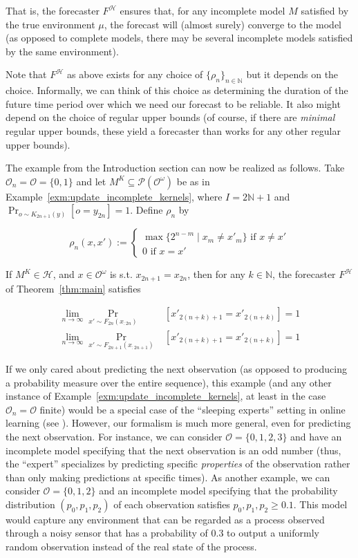 \documentclass[11pt]{article}
\theoremstyle{definition}
\theoremstyle{plain}
\newcommand{\Nats}{\mathbb{N}}
\newcommand{\Sq}[2]{\{#1\}_{#2 \in \Nats}}
\newcommand{\Sqn}[1]{\Sq{#1}{n}}
\newcommand{\PM}{\mathcal{P}}
\newcommand{\Ob}{\mathcal{O}}
\newcommand{\OO}{\Ob^\omega}
\newcommand{\PMO}{\PM(\OO)}
\newcommand{\MC}{\mathcal{H}}
\begin{document}
That is, the forecaster $F^\MC$ ensures that, for any incomplete model $M$ satisfied by the true environment $\mu$, the forecast will (almost surely) converge to the model (as opposed to complete models, there may be several incomplete models satisfied by the same environment).

Note that $F^\MC$ as above exists for any choice of $\Sqn{\rho_n}$ but it depends on the choice. Informally, we can think of this choice as determining the duration of the future time period over which we need our forecast to be reliable. It also might depend on the choice of regular upper bounds (of course, if there are \emph{minimal} regular upper bounds, these yield a forecaster than works for any other regular upper bounds).

The example from the Introduction section can now be realized as follows. Take $\Ob_n=\Ob=\{0,1\}$ and let $M^K \subseteq \PMO$ be as in Example~\ref{exm:update_incomplete_kernels}, where $I = 2\Nats+1$ and $\Pr_{o\sim K_{2n+1}(y)}\left[o=y_{2n}\right]=1$. Define $\rho_n$  by

\begin{equation}
\rho_n(x,x'):=\begin{cases} \max\{2^{n-m} \mid x_{m} \ne x'_{m}\} \text{ if } x \ne x' \\ 0 \text{ if } x=x'\end{cases}
\end{equation}

If $M^K \in \MC$, and $x\in\OO$ is s.t. $x_{2n+1}=x_{2n}$, then for any $k \in \Nats$, the forecaster $F^\MC$ of Theorem~\ref{thm:main} satisfies

\begin{align}
\lim_{n\rightarrow\infty} \Pr_{x' \sim F_{2n}\left(x_{:2n}\right)}&\left[x'_{2(n+k)+1}=x'_{2(n+k)}\right] = 1\\
\lim_{n\rightarrow\infty} \Pr_{x' \sim F_{2n+1}\left(x_{:2n+1}\right)}&\left[x'_{2(n+k)+1}=x'_{2(n+k)}\right] = 1
\end{align}

If we only cared about predicting the next observation (as opposed to producing a probability measure over the entire sequence), this example (and any other instance of Example~\ref{exm:update_incomplete_kernels}, at least in the case $\Ob_n=\Ob$ finite) would be a special case of the \enquote{sleeping experts} setting in online learning (see \cite{Freund_1997}). However, our formalism is much more general, even for predicting the next observation. For instance, we can consider $\Ob=\{0,1,2,3\}$ and have an incomplete model specifying that the next observation is an odd number (thus, the \enquote{expert} specializes by predicting specific \emph{properties} of the observation rather than only making predictions at specific times). As another example, we can consider $\Ob=\{0,1,2\}$ and an incomplete model specifying that the probability distribution $\left(p_0,p_1,p_2\right)$ of each observation satisfies $p_0,p_1,p_2 \geq 0.1$. This model would capture any environment that can be regarded as a process observed through a noisy sensor that has a probability of 0.3 to output a uniformly random observation instead of the real state of the process.
\end{document}
